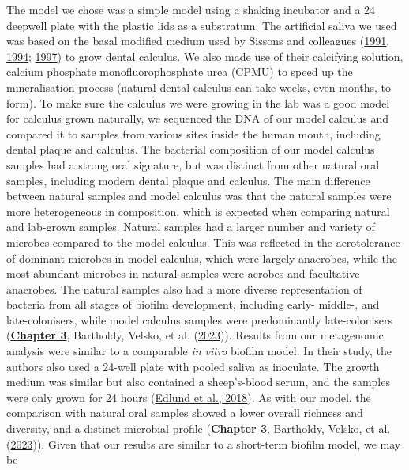 \documentclass[
  letterpaper,
]{book}
\begin{document}
The model we chose was a simple model using a shaking incubator and a 24
deepwell plate with the plastic lids as a substratum. The artificial
saliva we used was based on the basal modified medium used by Sissons
and colleagues
(\protect\hyperlink{ref-sissonsMultistationPlaque1991}{1991},
\protect\hyperlink{ref-sissonsPHResponse1994}{1994};
\protect\hyperlink{ref-sissonsArtificialPlaque1997}{1997}) to grow
dental calculus. We also made use of their calcifying solution, calcium
phosphate monofluorophosphate urea (CPMU) to speed up the mineralisation
process (natural dental calculus can take weeks, even months, to form).
To make sure the calculus we were growing in the lab was a good model
for calculus grown naturally, we sequenced the DNA of our model calculus
and compared it to samples from various sites inside the human mouth,
including dental plaque and calculus. The bacterial composition of our
model calculus samples had a strong oral signature, but was distinct
from other natural oral samples, including modern dental plaque and
calculus. The main difference between natural samples and model calculus
was that the natural samples were more heterogeneous in composition,
which is expected when comparing natural and lab-grown samples. Natural
samples had a larger number and variety of microbes compared to the
model calculus. This was reflected in the aerotolerance of dominant
microbes in model calculus, which were largely anaerobes, while the most
abundant microbes in natural samples were aerobes and facultative
anaerobes. The natural samples also had a more diverse representation of
bacteria from all stages of biofilm development, including early-
middle-, and late-colonisers, while model calculus samples were
predominantly late-colonisers
(\protect\hyperlink{byoc-valid}{\textbf{Chapter 3}}, Bartholdy, Velsko,
et al. (\protect\hyperlink{ref-bartholdyAssessingValidity2023}{2023})).
Results from our metagenomic analysis were similar to a comparable
\emph{in vitro} biofilm model. In their study, the authors also used a
24-well plate with pooled saliva as inoculate. The growth medium was
similar but also contained a sheep's-blood serum, and the samples were
only grown for 24 hours
(\protect\hyperlink{ref-edlundUncoveringComplex2018}{Edlund et al.,
2018}). As with our model, the comparison with natural oral samples
showed a lower overall richness and diversity, and a distinct microbial
profile (\protect\hyperlink{byoc-valid}{\textbf{Chapter 3}}, Bartholdy,
Velsko, et al.
(\protect\hyperlink{ref-bartholdyAssessingValidity2023}{2023})). Given
that our results are similar to a short-term biofilm model, we may be
\end{document}
